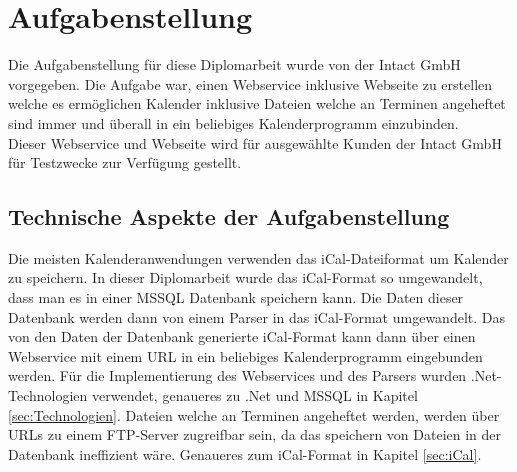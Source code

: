 \renewcommand{\theauthor}{Matthias Franz}

\chapter{Aufgabenstellung}
\label{sec:Aufgabenstellung}
Die Aufgabenstellung für diese Diplomarbeit wurde von der Intact GmbH vorgegeben. Die Aufgabe war, einen Webservice inklusive Webseite zu erstellen welche es ermöglichen Kalender inklusive Dateien welche an Terminen angeheftet sind immer und überall in ein beliebiges Kalenderprogramm einzubinden. \\
Dieser Webservice und Webseite wird für ausgewählte Kunden der Intact GmbH für Testzwecke zur Verfügung gestellt. \\

\section{Technische Aspekte der Aufgabenstellung}
\label{sec:TechnischeAspekteDerAufgabenstellung}
Die meisten Kalenderanwendungen verwenden das iCal-Dateiformat um Kalender zu speichern. In dieser Diplomarbeit wurde das iCal-Format so umgewandelt, dass man es in einer MSSQL Datenbank speichern kann. Die Daten dieser Datenbank werden dann von einem Parser in das iCal-Format umgewandelt. Das von den Daten der Datenbank generierte iCal-Format kann dann über einen Webservice mit einem URL in ein beliebiges Kalenderprogramm eingebunden werden. Für die Implementierung des Webservices und des Parsers wurden .Net-Technologien verwendet, genaueres zu .Net und MSSQL in Kapitel \ref{sec:Technologien}.  Dateien welche an Terminen angeheftet werden, werden über URLs zu einem FTP-Server zugreifbar sein, da das speichern von Dateien in der Datenbank ineffizient wäre. Genaueres zum iCal-Format in Kapitel \ref{sec:iCal}.
\pagebreak